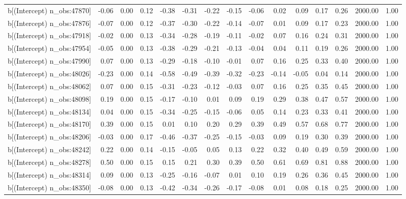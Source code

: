 \begin{table}[ht]
\begin{tabular}{rrrrrrrrrrrrrrr}
  b[(Intercept) n\_obs:47870] & -0.06 & 0.00 & 0.12 & -0.38 & -0.31 & -0.22 & -0.15 & -0.06 & 0.02 & 0.09 & 0.17 & 0.26 & 2000.00 & 1.00 \\ 
  b[(Intercept) n\_obs:47876] & -0.07 & 0.00 & 0.12 & -0.37 & -0.30 & -0.22 & -0.14 & -0.07 & 0.01 & 0.09 & 0.17 & 0.23 & 2000.00 & 1.00 \\ 
  b[(Intercept) n\_obs:47918] & -0.02 & 0.00 & 0.13 & -0.34 & -0.28 & -0.19 & -0.11 & -0.02 & 0.07 & 0.16 & 0.24 & 0.31 & 2000.00 & 1.00 \\ 
  b[(Intercept) n\_obs:47954] & -0.05 & 0.00 & 0.13 & -0.38 & -0.29 & -0.21 & -0.13 & -0.04 & 0.04 & 0.11 & 0.19 & 0.26 & 2000.00 & 1.00 \\ 
  b[(Intercept) n\_obs:47990] & 0.07 & 0.00 & 0.13 & -0.29 & -0.18 & -0.10 & -0.01 & 0.07 & 0.16 & 0.25 & 0.33 & 0.40 & 2000.00 & 1.00 \\ 
  b[(Intercept) n\_obs:48026] & -0.23 & 0.00 & 0.14 & -0.58 & -0.49 & -0.39 & -0.32 & -0.23 & -0.14 & -0.05 & 0.04 & 0.14 & 2000.00 & 1.00 \\ 
  b[(Intercept) n\_obs:48062] & 0.07 & 0.00 & 0.15 & -0.31 & -0.23 & -0.12 & -0.03 & 0.07 & 0.16 & 0.25 & 0.35 & 0.45 & 2000.00 & 1.00 \\ 
  b[(Intercept) n\_obs:48098] & 0.19 & 0.00 & 0.15 & -0.17 & -0.10 & 0.01 & 0.09 & 0.19 & 0.29 & 0.38 & 0.47 & 0.57 & 2000.00 & 1.00 \\ 
  b[(Intercept) n\_obs:48134] & 0.04 & 0.00 & 0.15 & -0.34 & -0.25 & -0.15 & -0.06 & 0.05 & 0.14 & 0.23 & 0.33 & 0.41 & 2000.00 & 1.00 \\ 
  b[(Intercept) n\_obs:48170] & 0.39 & 0.00 & 0.15 & 0.01 & 0.10 & 0.20 & 0.29 & 0.39 & 0.49 & 0.57 & 0.68 & 0.77 & 2000.00 & 1.00 \\ 
  b[(Intercept) n\_obs:48206] & -0.03 & 0.00 & 0.17 & -0.46 & -0.37 & -0.25 & -0.15 & -0.03 & 0.09 & 0.19 & 0.30 & 0.39 & 2000.00 & 1.00 \\ 
  b[(Intercept) n\_obs:48242] & 0.22 & 0.00 & 0.14 & -0.15 & -0.05 & 0.05 & 0.13 & 0.22 & 0.32 & 0.40 & 0.49 & 0.59 & 2000.00 & 1.00 \\ 
  b[(Intercept) n\_obs:48278] & 0.50 & 0.00 & 0.15 & 0.15 & 0.21 & 0.30 & 0.39 & 0.50 & 0.61 & 0.69 & 0.81 & 0.88 & 2000.00 & 1.00 \\ 
  b[(Intercept) n\_obs:48314] & 0.09 & 0.00 & 0.13 & -0.25 & -0.16 & -0.07 & 0.01 & 0.10 & 0.19 & 0.26 & 0.36 & 0.45 & 2000.00 & 1.00 \\ 
  b[(Intercept) n\_obs:48350] & -0.08 & 0.00 & 0.13 & -0.42 & -0.34 & -0.26 & -0.17 & -0.08 & 0.01 & 0.08 & 0.18 & 0.25 & 2000.00 & 1.00 \\ 

\end{tabular}
\end{table}
